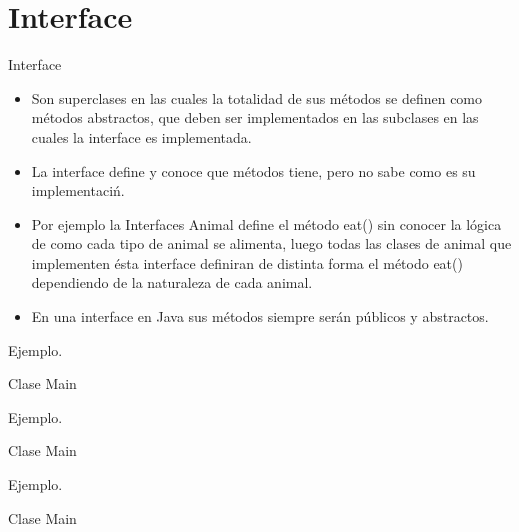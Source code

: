 \section{Interface}
\begin{frame}{Interface}
\begin{itemize}{}
\item Son  superclases en las cuales la totalidad de sus m\'etodos se definen como  m\'etodos abstractos, que deben ser implementados en las subclases en las cuales la interface es implementada.
\item La interface define y conoce que métodos tiene, pero no sabe como es su implementaci\'n.
\item Por ejemplo la Interfaces Animal define el m\'etodo eat() sin conocer la l\'ogica
 de como cada tipo de animal se alimenta, luego todas las clases de animal que implementen
 \'esta interface definiran de distinta forma el m\'etodo eat() dependiendo de la naturaleza de cada animal.
\item En una interface en Java sus m\'etodos siempre  ser\'an p\'ublicos y abstractos.
\end{itemize}
\end{frame}

\begin{frame}{Ejemplo.}
	\begin{block}{Clase Main}

\end{block}
\end{frame}

\begin{frame}{Ejemplo.}
	\begin{block}{Clase Main}

\end{block}
\end{frame}

\begin{frame}{Ejemplo.}
	\begin{block}{Clase Main}

\end{block}
\end{frame}
